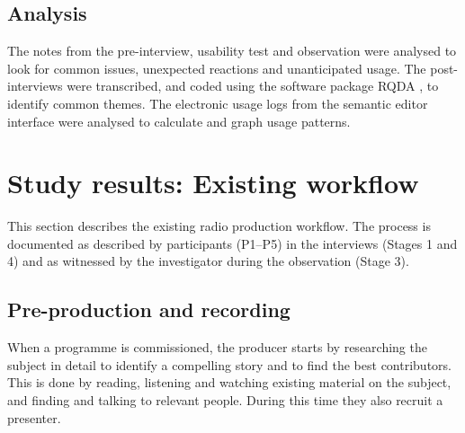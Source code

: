 \subsection{Analysis}
The notes from the pre-interview, usability test and observation were analysed
to look for common issues, unexpected reactions and unanticipated usage. The
post-interviews were transcribed, and coded using the software package RQDA
\citep{RQDA}, to identify common themes. The electronic usage logs from the
semantic editor interface were analysed to calculate and graph usage patterns.

\section{Study results: Existing workflow}\label{sec:resultsexisting}



This section describes the existing radio production workflow. The process is
documented as described by participants (P1--P5) in the interviews (Stages 1
and 4) and as witnessed by the investigator during the observation (Stage 3).

\subsection{Pre-production and recording}
When a programme is commissioned, the producer starts by researching the
subject in detail to identify a compelling story and to find the best
contributors. This is done by reading, listening and watching existing material
on the subject, and finding and talking to relevant people. During this time
they also recruit a presenter.

